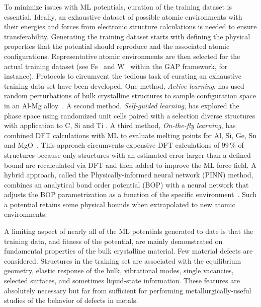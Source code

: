 \documentclass{article}
\begin{document}
To minimize issues with ML potentials, curation of the training dataset is essential.
Ideally, an exhaustive dataset of possible atomic environments with their energies and forces from electronic structure calculations is needed to ensure transferability.
Generating the training dataset starts with defining the physical properties that the potential should reproduce and the associated atomic configurations. Representative atomic environments are then selected for the actual training dataset (see Fe~\cite{Dragoni2018AchievingIron} and W~\cite{Szlachta2014AccuracyTungsten} within the GAP framework, for instance).
Protocols to circumvent the tedious task of curating an exhaustive training data set have been developed.  One method, \textit{Active learning}, has used random perturbations of bulk crystalline structures to sample configuration space in an Al-Mg alloy~\cite{Zhang2019ActiveSimulation}.  A second method, \textit{Self-guided learning}, has explored the phase space using randomized unit cells paired with a selection diverse structures with application to C, Si and Ti \cite{Bernstein2019DeSurfaces}.
A third method, \textit{On-the-fly learning}, has combined DFT calculations with ML to evaluate melting points for Al, Si, Ge, Sn and MgO~\cite{Jinnouchi2019On-the-flyPointsb}.
This approach circumvents expensive DFT calculations of $99\,$\% of structures because only structures with an estimated error larger than a defined bound are recalculated via DFT and then added to improve the ML force field.  A hybrid approach, called the Physically-informed neural network (PINN) method, combines an analytical bond order potential (BOP) with a neural network that adjusts the BOP parametrization as a function of the specific environment~\cite{PurjaPun0PhysicallyMaterials}.  Such a potential retains some physical bounds when extrapolated to new atomic environments.

A limiting aspect of nearly all of the ML potentials generated to date is that the training data, and fitness of the potential, are mainly demonstrated on fundamental properties of the bulk crystalline material.  Few material defects are considered.
Structures in the training set are associated with the equilibrium geometry, elastic response of the bulk, vibrational modes, single vacancies, selected surfaces, and sometimes liquid-state information.
These features are absolutely necessary but far from sufficient for performing metallurgically-useful studies of the behavior of defects in metals.
\end{document}
